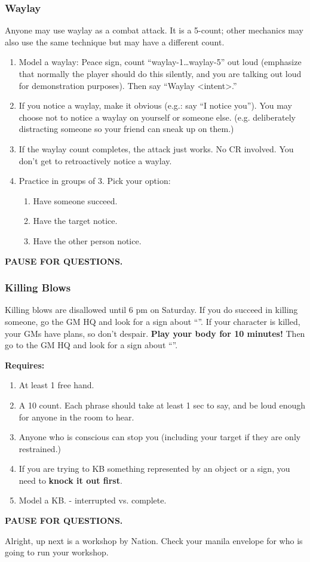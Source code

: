 \documentclass[green]{GL2020}
\begin{document}
\subsubsection*{Waylay}
Anyone may use waylay as a combat attack. It is a 5-count; other mechanics may also use the same technique but may have a different count.
\begin{enumerate}
	\item Model a waylay: Peace sign, count ``waylay-1\ldots waylay-5'' out loud (emphasize that normally the player should do this silently, and you are talking out loud for demonstration purposes). Then say ``Waylay <intent>.''
	\item If you notice a waylay, make it obvious (e.g.: say ``I notice you''). You may choose not to notice a waylay on yourself or someone else. (e.g. deliberately distracting someone so your friend can sneak up on them.)
	\item If the waylay count completes, the attack just works. No CR involved. You don’t get to retroactively notice a waylay.
	\item Practice in groups of 3. Pick your option:
	\begin{enumerate}
		\item Have someone succeed.
		\item Have the target notice.
		\item Have the other person notice.
	\end{enumerate}
\end{enumerate}

\textbf{PAUSE FOR QUESTIONS.}

\subsubsection*{Killing Blows}
Killing blows are disallowed until 6 pm on Saturday. If you do succeed in killing someone, go the GM HQ and look for a sign about ``\sMurderConsequences{}''. If your character is killed, your GMs have plans, so don’t despair. \textbf{Play your body for 10 minutes!} Then go to the GM HQ and look for a sign about ``\sMurdered{}''.

\textbf{Requires:}
\begin{enumerate}
	\item At least 1 free hand.
	\item A 10 count. Each phrase should take at least 1 sec to say, and be loud enough for anyone in the room to hear.
	\item Anyone who is conscious can stop you (including your target if they are only restrained.)
	\item If you are trying to KB something represented by an object or a sign, you need to\textbf{ knock it out first}.
	\item Model a KB. - interrupted vs. complete.
\end{enumerate}

\textbf{PAUSE FOR QUESTIONS.}

Alright, up next is a workshop by Nation. Check your manila envelope for who is going to run your workshop.
\end{document}
